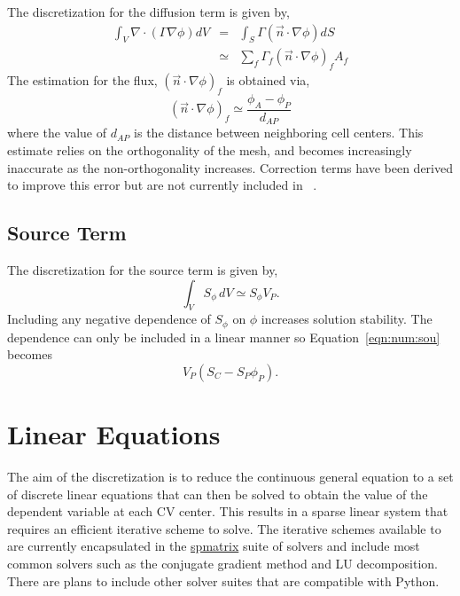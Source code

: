 The discretization for the diffusion term is given by,
\begin{eqnarray}
\int_V \nabla \cdot (\Gamma\nabla\phi) dV & = & \int_S \Gamma (\vec{n} \cdot \nabla\phi) dS \\
& \simeq & \sum_f \Gamma_f (\vec{n} \cdot \nabla\phi)_f A_f
\label{eqn:num:dif}
\end{eqnarray}
The estimation for the flux, $(\vec{n} \cdot \nabla\phi)_f$ is obtained via,
\begin{equation}
(\vec{n} \cdot \nabla\phi)_f \simeq \frac{\phi_A-\phi_P}{d_{AP}}
\end{equation}
where the value of $d_{AP}$ is the distance between neighboring cell
centers.  This estimate relies on the orthogonality of the mesh, and
becomes increasingly inaccurate as the non-orthogonality increases.
Correction terms have been derived to improve this error but are not
currently included in \FiPy{}~\cite{croftphd}.

\subsection{Source Term}

The discretization for the source term is given by, 
\begin{equation}
\int_V S_{\phi}\,dV \simeq S_\phi V_P.
\label{eqn:num:sou}
\end{equation}
Including any negative dependence of $S_\phi$ on $\phi$ increases
solution stability. The dependence can only be included in a linear
manner so Equation~\eqref{eqn:num:sou} becomes
\begin{equation}
V_P (S_C - S_P \phi_P).
\end{equation}

\section{Linear Equations}

The aim of the discretization is to reduce the continuous general
equation to a set of discrete linear equations that can then be solved
to obtain the value of the dependent variable at each CV center. This
results in a sparse linear system that requires an efficient iterative
scheme to solve. The iterative schemes available to \FiPy{} are
currently encapsulated in the \href{#id5}{spmatrix} suite of solvers
and include most common solvers such as the conjugate gradient method
and LU decomposition. There are plans to include other solver suites
that are compatible with Python.

